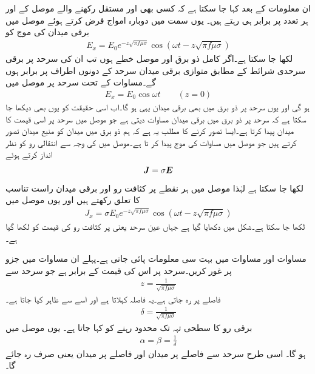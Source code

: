 ان معلومات کے بعد کہا جا سکتا ہے کہ کسی بھی اور  مستقل رکھنے والے موصل کے  اور  ہر تعدد پر برابر ہی رہتے ہیں۔ یوں  سمت میں دوبارہ امواج فرض کرتے ہوئے موصل میں برقی میدان کی موج کو
\begin{align}\label{مساوات_موج_موصل_موج}
E_x=E_0 e^{-z \sqrt{\pi f \mu \sigma}} \cos (\omega t - z \sqrt{\pi f \mu \sigma})
\end{align}
لکھا جا سکتا ہے۔اگر  کامل ذو برق اور  موصل خطے ہوں تب ان کی سرحد  پر برقی سرحدی شرائط کے مطابق متوازی برقی میدان سرحد کے دونوں اطراف پر برابر ہوں گے۔مساوات  کے تحت سرحد پر موصل میں
\begin{align}\label{مساوات_موج_موصل_ذو_برق_سرحد_موج}
E_x=E_0  \cos \omega t \quad  \quad (z=0)
\end{align}
ہو گی اور یوں سرحد پر ذو برق میں بھی برقی میدان یہی ہو گا۔اب اسی حقیقت کو یوں بھی دیکھا جا سکتا ہے کہ سرحد پر ذو برق میں برقی میدان مساوات  دیتی ہے جو موصل میں سرحد پر اسی قیمت کا میدان پیدا کرتا ہے۔ایسا تصور کرنے کا مطلب یہ ہے کہ ہم ذو برق میں میدان کو منبع میدان تصور کرتے ہیں جو موصل میں مساوات  کی موج پیدا کر تا ہے۔موصل میں  کی وجہ سے انتقالی رو کو نظر انداز کرتے ہوئے
\begin{align}
{\ensuremath{{\boldsymbol{J}}}}=\sigma {\ensuremath{{\boldsymbol{E}}}}
\end{align}
لکھا جا سکتا ہے لہٰذا موصل میں ہر نقطے پر کثافت رو اور برقی میدان راست تناسب کا تعلق رکھتے ہیں اور یوں موصل میں
\begin{align}\label{مساوات_موج_موصل_کثافت_رو_موج}
J_x=\sigma E_0 e^{-z \sqrt{\pi f \mu \sigma}} \cos (\omega t - z \sqrt{\pi f \mu \sigma})
\end{align}
لکھا جا سکتا ہے۔شکل  میں  دکھایا گیا ہے جہاں عین سرحد یعنی  پر کثافت رو کی قیمت  کو  لکھا گیا ہے۔

مساوات  اور مساوات  میں بہت سی معلومات پائی جاتی ہے۔پہلے ان مساوات میں
   جزو پر غور کریں۔سرحد پر اس کی قیمت  کے برابر ہے جو سرحد سے
\begin{align*}
z=\frac{1}{\sqrt{\pi f \mu \sigma}}
\end{align*}
فاصلے پر  رہ جاتی ہے۔یہ فاصلہ  کہلاتا ہے  اور اسے   سے ظاہر کیا جاتا ہے۔
\begin{align}\label{مساوات_موج_گہرائی_جلد_تعریف}
\delta =\frac{1}{\sqrt{\pi f \mu \sigma}}
\end{align}
برقی رو کا سطحی تہہ تک محدود رہنے کو  کہا جاتا ہے۔
یوں موصل میں
\begin{align}\label{مساوات_موج_گہرائی_جلد_کے_تعلق}
\alpha=\beta=\frac{1}{\delta}
\end{align}
ہو گا۔
اسی طرح سرحد سے  فاصلے پر میدان  اور   فاصلے پر میدان  یعنی صرف  رہ جائے گا۔


